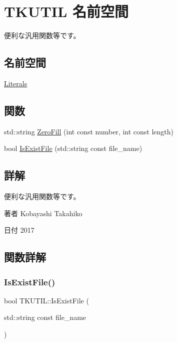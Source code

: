 \hypertarget{namespace_t_k_u_t_i_l}{}\section{T\+K\+U\+T\+IL 名前空間}
\label{namespace_t_k_u_t_i_l}


便利な汎用関数等です。  


\subsection*{名前空間}
\begin{DoxyCompactItemize}
\item 
 \hyperlink{namespace_t_k_u_t_i_l_1_1_literals}{Literals}
\end{DoxyCompactItemize}
\subsection*{関数}
\begin{DoxyCompactItemize}
\item 
std\+::string \hyperlink{namespace_t_k_u_t_i_l_a02b37f2f23e258b7a44b83e1ac5b81b7}{Zero\+Fill} (int const number, int const length)
\item 
bool \hyperlink{namespace_t_k_u_t_i_l_ab26eef58ef280f33492f52cb4fbe6b5d}{Is\+Exist\+File} (std\+::string const file\+\_\+name)
\end{DoxyCompactItemize}


\subsection{詳解}
便利な汎用関数等です。 

\begin{DoxyAuthor}{著者}
Kobayashi Takahiko 
\end{DoxyAuthor}
\begin{DoxyDate}{日付}
2017 
\end{DoxyDate}


\subsection{関数詳解}
\mbox{\label{namespace_t_k_u_t_i_l_ab26eef58ef280f33492f52cb4fbe6b5d}} 
\subsubsection{\texorpdfstring{Is\+Exist\+File()}{IsExistFile()}}
{\footnotesize\ttfamily bool T\+K\+U\+T\+I\+L\+::\+Is\+Exist\+File (\begin{DoxyParamCaption}\item[{std\+::string const}]{file\+\_\+name }\end{DoxyParamCaption})}

